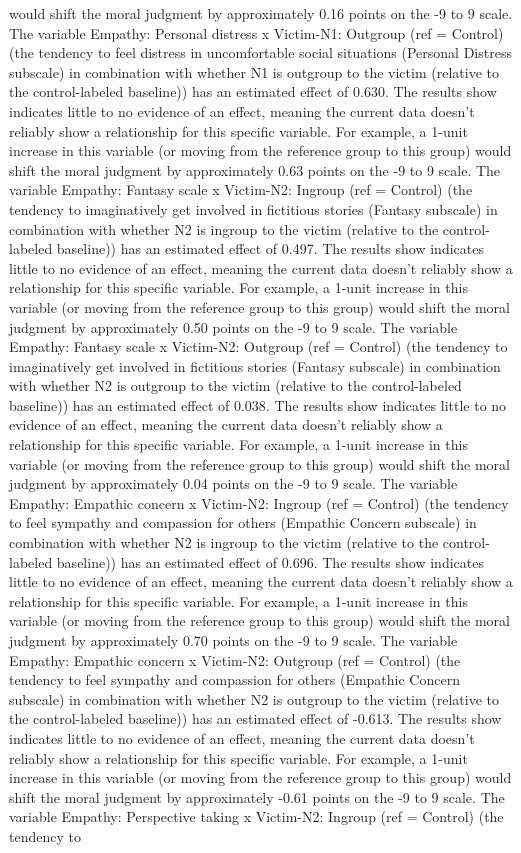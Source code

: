 \documentclass[11pt]{article}
\begin{document}
would shift the moral judgment by approximately 0.16 points on the -9 to 9 scale. The variable Empathy: Personal distress x Victim-N1: Outgroup (ref = Control) (the tendency to feel distress in uncomfortable social situations (Personal Distress subscale) in combination with whether N1 is outgroup to the victim (relative to the control-labeled baseline)) has an estimated effect of 0.630. The results show indicates little to no evidence of an effect, meaning the current data doesn't reliably show a relationship for this specific variable. For example, a 1-unit increase in this variable (or moving from the reference group to this group) would shift the moral judgment by approximately 0.63 points on the -9 to 9 scale. The variable Empathy: Fantasy scale x Victim-N2: Ingroup (ref = Control) (the tendency to imaginatively get involved in fictitious stories (Fantasy subscale) in combination with whether N2 is ingroup to the victim (relative to the control-labeled baseline)) has an estimated effect of 0.497. The results show indicates little to no evidence of an effect, meaning the current data doesn't reliably show a relationship for this specific variable. For example, a 1-unit increase in this variable (or moving from the reference group to this group) would shift the moral judgment by approximately 0.50 points on the -9 to 9 scale. The variable Empathy: Fantasy scale x Victim-N2: Outgroup (ref = Control) (the tendency to imaginatively get involved in fictitious stories (Fantasy subscale) in combination with whether N2 is outgroup to the victim (relative to the control-labeled baseline)) has an estimated effect of 0.038. The results show indicates little to no evidence of an effect, meaning the current data doesn't reliably show a relationship for this specific variable. For example, a 1-unit increase in this variable (or moving from the reference group to this group) would shift the moral judgment by approximately 0.04 points on the -9 to 9 scale. The variable Empathy: Empathic concern x Victim-N2: Ingroup (ref = Control) (the tendency to feel sympathy and compassion for others (Empathic Concern subscale) in combination with whether N2 is ingroup to the victim (relative to the control-labeled baseline)) has an estimated effect of 0.696. The results show indicates little to no evidence of an effect, meaning the current data doesn't reliably show a relationship for this specific variable. For example, a 1-unit increase in this variable (or moving from the reference group to this group) would shift the moral judgment by approximately 0.70 points on the -9 to 9 scale. The variable Empathy: Empathic concern x Victim-N2: Outgroup (ref = Control) (the tendency to feel sympathy and compassion for others (Empathic Concern subscale) in combination with whether N2 is outgroup to the victim (relative to the control-labeled baseline)) has an estimated effect of -0.613. The results show indicates little to no evidence of an effect, meaning the current data doesn't reliably show a relationship for this specific variable. For example, a 1-unit increase in this variable (or moving from the reference group to this group) would shift the moral judgment by approximately -0.61 points on the -9 to 9 scale. The variable Empathy: Perspective taking x Victim-N2: Ingroup (ref = Control) (the tendency to 
\end{document}
